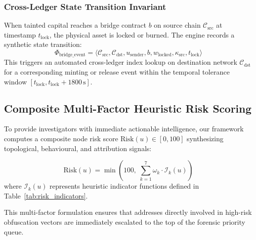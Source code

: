 \subsubsection{Cross-Ledger State Transition Invariant}
When tainted capital reaches a bridge contract $b$ on source chain $\mathcal{C}_{\text{src}}$ at timestamp $t_{\text{lock}}$, the physical asset is locked or burned. The engine records a synthetic state transition:
\begin{equation}
    \Phi_{\text{bridge\_event}} = \langle \mathcal{C}_{\text{src}}, \mathcal{C}_{\text{dst}}, u_{\text{sender}}, b, w_{\text{locked}}, \kappa_{\text{src}}, t_{\text{lock}} \rangle
\end{equation}
This triggers an automated cross-ledger index lookup on destination network $\mathcal{C}_{\text{dst}}$ for a corresponding minting or release event within the temporal tolerance window $[t_{\text{lock}}, t_{\text{lock}} + 1800\,\text{s}]$.

\subsection{Composite Multi-Factor Heuristic Risk Scoring}

To provide investigators with immediate actionable intelligence, our framework computes a composite node risk score $\text{Risk}(u) \in [0, 100]$ synthesizing topological, behavioural, and attribution signals:

\begin{equation}
    \text{Risk}(u) = \min\left(100, \; \sum_{k=1}^{7} \omega_k \cdot \mathcal{I}_k(u) \right)
    \label{eq:risk_score}
\end{equation}
where $\mathcal{I}_k(u)$ represents heuristic indicator functions defined in Table~\ref{tab:risk_indicators}.

\begin{table}[h]
\centering
\caption{Heuristic Risk Scoring Indicator Weights.}
\label{tab:risk_indicators}
\end{table}

This multi-factor formulation ensures that addresses directly involved in high-risk obfuscation vectors are immediately escalated to the top of the forensic priority queue.
